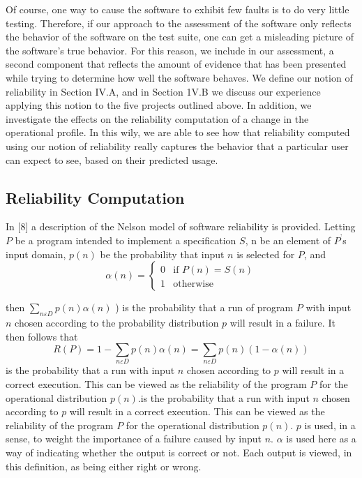 \documentclass[journal, twoside]{IEEEtran}
\begin{document}
Of course, one way to cause the software to exhibit few
faults is to do very little testing. Therefore, if our approach to
the assessment of the software only reflects the behavior of the
software on the test suite, one can get a misleading picture of
the software’s true behavior. For this reason, we include in our
assessment, a second component that reflects the amount of
evidence that has been presented while trying to determine
how well the software behaves. We define our notion of reliability in Section IV.A, and in Section 1V.B we discuss our
experience applying this notion to the five projects outlined
above. In addition, we investigate the effects on the reliability
computation of a change in the operational profile. In this wily,
we are able to see how that reliability computed using our notion of reliability really captures the behavior that a particular
user can expect to see, based on their predicted usage. 

\subsection{Reliability Computation}
In [8] a description of the Nelson model of software reliability is provided. Letting $P$ be a program intended to implement a specification $S$, n be an element of $P^’$s input domain,
$p(n)$ be the probability that input $n$ is selected for $P$, and
\begin{equation*}
    \alpha(n) = 
\begin{cases}
    0& \text{if } P(n) = S(n) \\
    1              & \text{otherwise}
\end{cases}
\end{equation*}

then $\sum_{n\varepsilon D} p(n) \alpha(n)$ ) is the probability that a run of program $P$
with input $n$ chosen according to the probability distribution $p$
will result in a failure. It then follows that 
\vspace{3cm}
\begin{equation*}
    R(P)=1-\sum_{n\varepsilon D}p(n)\alpha(n) = \sum_{n\varepsilon D}p(n)(1-\alpha(n)) 
\end{equation*}
is the probability that a run with input $n$ chosen according to $p$
will result in a correct execution. This can be viewed as the
reliability of the program $P$ for the operational distribution $p(n)$.is the probability that a run with input $n$ chosen according to $p$
will result in a correct execution. This can be viewed as the
reliability of the program $P$ for the operational distribution
$p(n)$. $p$ is used, in a sense, to weight the importance of a failure
caused by input $n$. $\alpha$ is used here as a way of indicating
whether the output is correct or not. Each output is viewed, in
this definition, as being either right or wrong.
\end{document}
